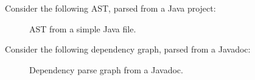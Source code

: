 \documentclass{article}
\begin{document}
Consider the following AST, parsed from a Java project:

\begin{figure}
    \centering
    
    \caption{AST from a simple Java file.}
    \label{fig:ast}
\end{figure}

Consider the following dependency graph, parsed from a Javadoc:

\begin{figure}
    \centering
    
    \caption{Dependency parse graph from a Javadoc.}
    \label{fig:eng}
\end{figure}
\clearpage
\newpage



\end{document}

